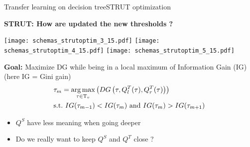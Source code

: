 \begin{frame}{Transfer learning on decision tree}{STRUT optimization}
\begin{minipage}[t]{0.4\linewidth}
    \vspace{0pt}
    \centering
    \textbf{STRUT: How are updated the new thresholds ?}\\
    \renewcommand{\ratio}{1.0}
    \begin{overprint}
        \texttt{[image: schemas\_strutoptim\_3\_15.pdf]}
        \texttt{[image: schemas\_strutoptim\_4\_15.pdf]}
        \texttt{[image: schemas\_strutoptim\_5\_15.pdf]}
    \end{overprint}
\end{minipage}\hfill
\begin{minipage}[t]{0.55\linewidth}
    \vspace{0pt}
    
    \textbf{Goal: } Maximize DG while being in a local maximum of Information Gain (IG) (here IG = Gini gain)
    \pause \pause \pause
    \begin{align*}
        &\tau_{m} = \operatorname*{arg\,max}_{\tau \in \mathrm{T}_{v}}\left(DG\left(  \tau ,  Q_{l}^{T}(\tau), Q_{r}^{T}(\tau)\right)\right) \\
        &\text{s.t.\ } IG(\tau_{m-1}) < IG(\tau_{m}) \text{ and } IG(\tau_{m}) > IG(\tau_{m+1})
    \end{align*}
    \vspace{1cm}

    \pause
    \begin{itemize}
        \item  $Q^S$ have less meaning when going deeper
        \item  Do we really want to keep $Q^S$ and $Q^T$ close ?
    \end{itemize}
\end{minipage}

\end{frame}

